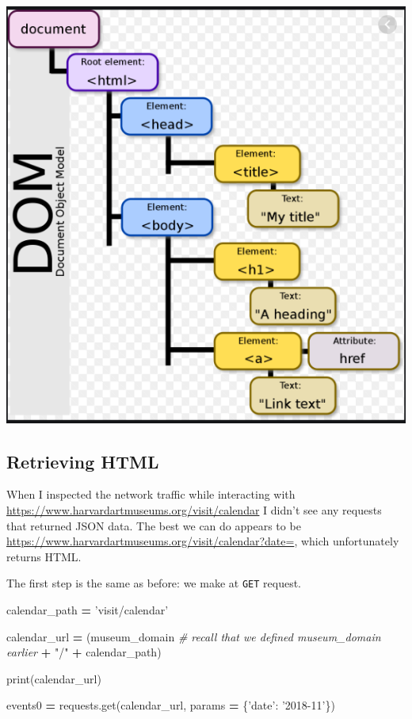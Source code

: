 \documentclass[
]{book}
\newenvironment{Shaded}{\begin{snugshade}}{\end{snugshade}}
\newcommand{\BuiltInTok}[1]{#1}
\newcommand{\CommentTok}[1]{\textcolor[rgb]{0.56,0.35,0.01}{\textit{#1}}}
\newcommand{\NormalTok}[1]{#1}
\newcommand{\OperatorTok}[1]{\textcolor[rgb]{0.81,0.36,0.00}{\textbf{#1}}}
\newcommand{\StringTok}[1]{\textcolor[rgb]{0.31,0.60,0.02}{#1}}
\begin{document}
\includegraphics{Python/PythonWebScrape/images/DOM.png}

\hypertarget{retrieving-html}{%
\subsection{Retrieving HTML}\label{retrieving-html}}

When I inspected the network traffic while interacting
with \url{https://www.harvardartmuseums.org/visit/calendar} I didn't see
any requests that returned JSON data. The best we can do appears to be
\url{https://www.harvardartmuseums.org/visit/calendar?date=}, which
unfortunately returns HTML.

The first step is the same as before: we make at \texttt{GET} request.

\begin{Shaded}
\begin{Highlighting}[]
\NormalTok{calendar_path }\OperatorTok{=} \StringTok{'visit/calendar'}

\NormalTok{calendar_url }\OperatorTok{=}\NormalTok{ (museum_domain }\CommentTok{# recall that we defined museum_domain earlier}
                  \OperatorTok{+} \StringTok{"/"}
                  \OperatorTok{+}\NormalTok{ calendar_path)}

\BuiltInTok{print}\NormalTok{(calendar_url)}

\NormalTok{events0 }\OperatorTok{=}\NormalTok{ requests.get(calendar_url, params }\OperatorTok{=}\NormalTok{ \{}\StringTok{'date'}\NormalTok{: }\StringTok{'2018-11'}\NormalTok{\})}
\end{Highlighting}
\end{Shaded}
\end{document}
